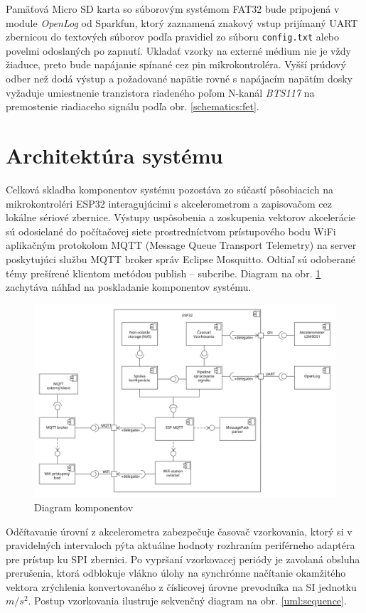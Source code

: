 Pamäťová Micro SD karta so súborovým systémom FAT32 bude pripojená v module \emph{OpenLog} od Sparkfun, ktorý zaznamená znakový
vstup prijímaný UART zbernicou do  textových súborov podľa pravidiel zo súboru \verb|config.txt| alebo povelmi odoslaných 
po zapnutí. Ukladať vzorky na externé médium nie je vždy žiaduce, preto bude napájanie spínané cez pin mikrokontroléra. Vyšší 
prúdový odber než dodá výstup a požadované napätie rovné s napájacím napätím dosky vyžaduje umiestnenie tranzistora riadeného 
poľom N-kanál \emph{BTS117} na premostenie riadiaceho signálu podľa obr. \ref{schematics:fet}.


\section{Architektúra systému}
Celková skladba komponentov systému pozostáva zo súčastí pôsobiacich na mikrokontroléri ESP32
interagujúcimi s akcelerometrom a zapisovačom cez lokálne sériové zbernice. Výstupy uspôsobenia a zoskupenia vektorov akcelerácie sú 
odosielané do počítačovej siete prostredníctvom prístupového bodu WiFi aplikačným protokolom MQTT (Message Queue Transport Telemetry)
na server poskytujúci službu MQTT broker správ Eclipse Mosquitto. Odtiaľ sú odoberané témy prešírené klientom metódou publish -- subcribe.
Diagram na obr. \ref{uml:component} zachytáva náhľad na poskladanie komponentov systému. 

\begin{figure}[h]
	\centering
	\includegraphics[width=\textwidth]{figures/design/components.png}
	\caption{Diagram komponentov}
	\label{uml:component}
\end{figure}

Odčítavanie úrovní z akcelerometra zabezpečuje časovač vzorkovania, ktorý si v pravidelných intervaloch pýta aktuálne hodnoty rozhraním 
periférneho adaptéra pre prístup ku SPI zbernici. Po vypršaní vzorkovacej periódy je zavolaná obsluha prerušenia, ktorá odblokuje vlákno 
úlohy na synchrónne načítanie okamžitého vektora zrýchlenia konvertovaného z číslicovej úrovne prevodníka na SI jednotku $m/s^2$. 
Postup vzorkovania ilustruje sekvenčný diagram na obr. \ref{uml:sequence}.

